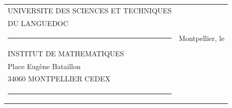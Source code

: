 \begin{tabular}{@{}l@{\qquad}l@{}}
UNIVERSITE DES SCIENCES ET TECHNIQUES &\\
DU LANGUEDOC &\\
\rule{1.4em}{.35pt}& Montpellier, le\\
INSTITUT DE MATHEMATIQUES &\\
Place Eugène Bataillon &\\
34060 MONTPELLIER CEDEX &\\
\rule{1.4em}{.35pt}&
\end{tabular}
